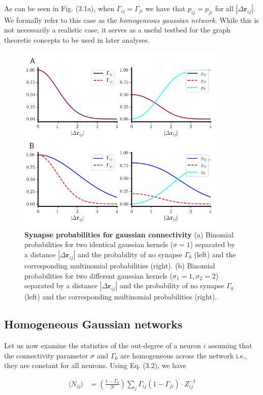 \documentclass{ucetd}
\begin{document}
As can be seen in Fig. (3.1a), when $\Gamma_{ij} = \Gamma_{ji}$ we have that $p_{ij} = p_{ji}$ for all $|\Delta \mathbf{r}_{ij}|$. We formally refer to this case as the \emph{homogeneous gaussian network}. While this is not necessarily a realistic case, it serves as a useful testbed for the graph theoretic concepts to be used in later analyses. 

\begin{figure}[t!]
\centering
\includegraphics[width=100mm]{fig_11}
\caption{\textbf{Synapse probabilities for gaussian connectivity} (a) Binomial probabilities for two identical gaussian kernels ($\sigma=1$) separated by a distance $|\Delta\mathbf{r}_{ij}|$ and the probability of no synapse $\Gamma_{0}$ (left) and the corresponding multinomial probabilities (right). (b) Binomial probabilities for two different gaussian kernels ($\sigma_{1}=1, \sigma_{2}=2$) separated by a distance $|\Delta\mathbf{r}_{ij}|$ and the probability of no synapse $\Gamma_{0}$ (left) and the corresponding multinomial probabilities (right). }
\end{figure}



\subsection{Homogeneous Gaussian networks}

Let us now examine the statistics of the out-degree of a neuron $i$ assuming that the connectivity parameter $\sigma$ and $\Gamma_{0}$ are homogeneous across the network i.e., they are constant for all neurons. Using Eq. (3.2), we have

\begin{align}
\langle N_{ij} \rangle &= \left(\frac{1-\Gamma_{0}}{N}\right)\sum_{j} \Gamma_{ij}(1-\Gamma_{ji})\cdot Z_{ij}^{-1}
\end{align}
\end{document}

